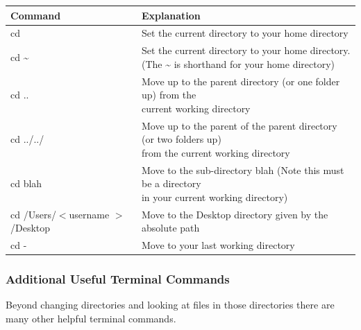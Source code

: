 \documentclass[12pt]{article}
\begin{document}
\begin{center}
  \begin{tabular}{| l | l | }
    \hline
    \textbf{Command} & \textbf{Explanation} \\ \hline
    cd        & Set the current directory to your home directory  \\ \hline
    cd \textasciitilde{}     & \shortstack[l]{Set the current directory to your home directory. \\ (The \textasciitilde{} is shorthand for your home directory)} \\  \hline
    cd ..     & \shortstack[l]{Move up to the parent directory (or one folder up) from the \\ current working directory} \\ \hline
    cd ../../ & \shortstack[l]{Move up to the parent of the parent directory (or two folders up)\\ from the current working directory} \\ \hline
    cd blah   & \shortstack[l]{Move to the sub-directory blah (Note this must be a directory\\ in your current working directory)} \\ \hline
    cd /Users/$<$username $>$/Desktop & Move to the Desktop directory given by the absolute path \\ \hline
    cd - & Move to your last working directory \\ \hline
\end{tabular}
\end{center}


\subsubsection{Additional Useful Terminal Commands}
Beyond changing directories and looking at files in those directories there are many other helpful terminal commands. 
\end{document}

